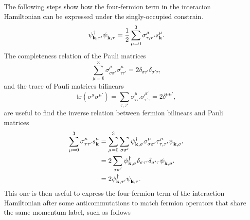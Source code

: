 \documentclass[english,aps,prd,nofootinbib,twocolumn]{revtex4-1}
\begin{document}
The following steps show how the four-fermion term in the interacion Hamiltonian can be expressed under the singly-occupied constrain. 
\begin{equation}
\psi_{\mathbf{k ,\tau'}}^{\textcolor{black}{\dagger}}
\psi_{\mathbf{k ,\tau }}^{\textcolor{white}{\dagger}} = 
\frac{1}{2}
\sum_{\mu=0}^{3} 
\sigma^{\mu }_{\tau ,\tau'}s^{\mu }_{\mathbf{k }}.
\end{equation}
The completeness relation of the Pauli matrices
\begin{equation}
\sum_{\mu=0}^{3} 
\sigma^{\mu }_{\sigma \sigma'}\sigma^{\mu }_{\tau \tau'} =  
2 \delta_{\sigma \tau'} \delta_{\sigma'\tau },
\end{equation}
and the trace of Pauli matrices bilinears 
\begin{equation}
\mathrm{tr}\left( \sigma^{\mu }\sigma^{\mu'} \right) = 
\sum_{\tau ,\tau'}
\sigma^{\mu }_{\tau \tau'}\sigma^{\mu'}_{\tau'\tau } = 
2 \delta^{\mu \mu'},
\end{equation}
are useful to find the inverse relation between fermion bilinears and Pauli matrices
\begin{equation}
\begin{split}
\sum_{\mu=0}^{3} 
\sigma^{\mu }_{\tau \tau'}s^{\mu}_{\mathbf{k }} &= 
\sum_{\mu=0}^{3} \sum_{\sigma \sigma'} 
\psi_{\mathbf{k ,\sigma }}^{\textcolor{black}{\dagger}}
\sigma^{\mu }_{\sigma \sigma'}\tau^{\mu }_{\tau ,\tau'}
\psi_{\mathbf{k ,\sigma'}}^{\textcolor{white}{\dagger}} \\ &= 
2
\sum_{\sigma \sigma'} 
\psi_{\mathbf{k ,\sigma }}^{\textcolor{black}{\dagger}}
\delta_{\sigma \tau'} \delta_{\sigma'\tau }
\psi_{\mathbf{k ,\sigma'}}^{\textcolor{white}{\dagger}} \\ &= 
2
\psi_{\mathbf{k ,\tau'}}^{\textcolor{black}{\dagger}}
\psi_{\mathbf{k ,\tau }}^{\textcolor{white}{\dagger}} .
\end{split}
\end{equation}
This one is then useful to express the four-fermion term of the interaction Hamiltonian after some anticommutations to match fermion operators that share the same momentum label, such as follows
\end{document}
